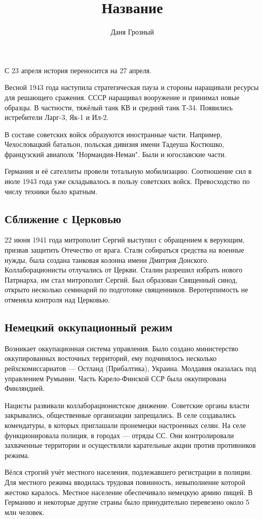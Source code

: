 \documentclass{article}
\title{Название}
\author{Даня Грозный}
\begin{document}
С 23 апреля история переносится на 27 апреля.

Весной 1943 года наступила стратегическая пауза и стороны наращивали ресурсы для решающего сражения. СССР наращивал вооружение и принимал новые образцы. В частности, тяжёлый танк КВ и средний танк Т-34. Появились истребители Ларг-3, Як-1 и Ил-2.

В составе советских войск образуются иностранные части. Например, Чехословацкий батальон, польская дивизия имени Тадеуша Костюшко, французский авиаполк "Нормандия-Неман". Были и югославские части.

Германия и её сателлиты провели тотальную мобилизацию. Соотношение сил в июле 1943 года уже складывалось в пользу советских войск. Превосходство по числу техники было кратным.

\subsection{Сближение с Церковью}

22 июня 1941 года митрополит Сергий выступил с обращением к верующим, призвав защитить Отечество от врага. Стали собираться средства на военные нужды, была создана танковая колонна имени Дмитрия Донского. Коллаборационисты отлучались от Церкви. Сталин разрешил избрать нового Патриарха, им стал митрополит Сергий. Был образован Священный синод, открыто несколько семинарий по подготовке священников. Веротерпимость не отменяла контроля над Церковью.

\subsection{Немецкий оккупационный режим}

Возникает оккупационная система управления. Было создано министерство оккупированных восточных территорий, ему подчинялось несколько рейхскомиссариатов --- Остланд (Прибалтика), Украина. Молдавия оказалась под управлением Румынии. Часть Карело-Финской ССР была оккупирована Финляндией.

Нацисты развивали коллаборационистское движение. Советские органы власти закрывались, общественные организации запрещались. В селе создавались комендатуры, в которых приглашали пронемецки настроенных селян. На селе функционировала полиция, в городах --- отряды СС. Они контролировали захваченные территории и осуществляли карательные акции против противников режима.

Вёлся строгий учёт местного населения, подлежавшего регистрации в полиции. Для местного режима вводилась трудовая повинность, невыполнение которой жестоко каралось. Местное население обеспечивало немецкую армию пищей. В Германию и некоторые другие страны было принудительно перевезено около 5 млн человек.
\end{document}

